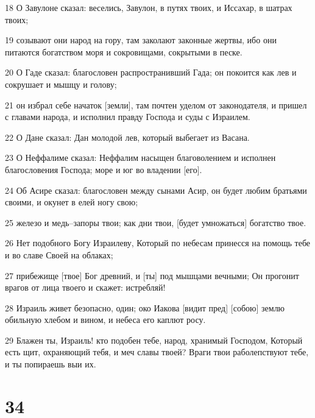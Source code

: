 \par 18 О Завулоне сказал: веселись, Завулон, в путях твоих, и Иссахар, в шатрах твоих;
\par 19 созывают они народ на гору, там заколают законные жертвы, ибо они питаются богатством моря и сокровищами, сокрытыми в песке.
\par 20 О Гаде сказал: благословен распространивший Гада; он покоится как лев и сокрушает и мышцу и голову;
\par 21 он избрал себе начаток [земли], там почтен уделом от законодателя, и пришел с главами народа, и исполнил правду Господа и суды с Израилем.
\par 22 О Дане сказал: Дан молодой лев, который выбегает из Васана.
\par 23 О Неффалиме сказал: Неффалим насыщен благоволением и исполнен благословения Господа; море и юг во владении [его].
\par 24 Об Асире сказал: благословен между сынами Асир, он будет любим братьями своими, и окунет в елей ногу свою;
\par 25 железо и медь--запоры твои; как дни твои, [будет умножаться] богатство твое.
\par 26 Нет подобного Богу Израилеву, Который по небесам принесся на помощь тебе и во славе Своей на облаках;
\par 27 прибежище [твое] Бог древний, и [ты] под мышцами вечными; Он прогонит врагов от лица твоего и скажет: истребляй!
\par 28 Израиль живет безопасно, один; око Иакова [видит пред] [собою] землю обильную хлебом и вином, и небеса его каплют росу.
\par 29 Блажен ты, Израиль! кто подобен тебе, народ, хранимый Господом, Который есть щит, охраняющий тебя, и меч славы твоей? Враги твои раболепствуют тебе, и ты попираешь выи их.

\chapter{34}

